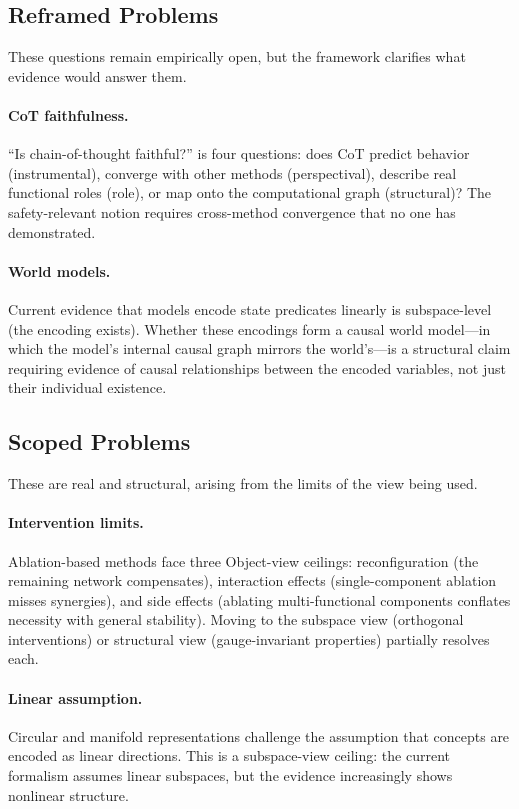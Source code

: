\documentclass{article}
\begin{document}
\subsection{Reframed Problems}

These questions remain empirically open, but the framework clarifies
what evidence would answer them.

\paragraph{CoT faithfulness.}
``Is chain-of-thought faithful?'' is four questions: does CoT predict
behavior (instrumental), converge with other methods (perspectival),
describe real functional roles (role), or map onto the computational
graph (structural)?  The safety-relevant notion requires cross-method
convergence that no one has demonstrated.

\paragraph{World models.}
Current evidence that models encode state predicates linearly is
subspace-level (the encoding exists).  Whether these encodings form a
causal world model---in which the model's internal causal graph mirrors
the world's---is a structural claim requiring evidence of causal
relationships between the encoded variables, not just their individual
existence.

\subsection{Scoped Problems}

These are real and structural, arising from the limits of the view
being used.

\paragraph{Intervention limits.}
Ablation-based methods face three Object-view ceilings: reconfiguration
(the remaining network compensates), interaction effects (single-component
ablation misses synergies), and side effects (ablating multi-functional
components conflates necessity with general stability).  Moving to the
subspace view (orthogonal interventions) or structural view
(gauge-invariant properties) partially resolves each.

\paragraph{Linear assumption.}
Circular and manifold representations challenge the assumption that
concepts are encoded as linear directions.  This is a subspace-view
ceiling: the current formalism assumes linear subspaces, but the
evidence increasingly shows nonlinear structure.
\end{document}
